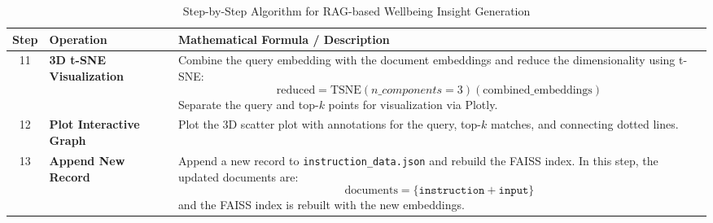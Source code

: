 \begin{table}[H]
    \centering
    \caption*{Step-by-Step Algorithm for RAG-based Wellbeing Insight Generation}
    \label{tab:algorithm}
    \begin{tabularx}{\textwidth}{|c|p{3cm}|X|}
        \hline
        \textbf{Step} & \textbf{Operation} & \textbf{Mathematical Formula / Description} \\ \hline
    
        11 & \textbf{3D t-SNE Visualization} & Combine the query embedding with the document embeddings and reduce the dimensionality using t-SNE:
        \[
        \text{reduced} = \text{TSNE}(n\_components=3)(\text{combined\_embeddings})
        \]
        Separate the query and top-\(k\) points for visualization via Plotly. \\ \hline
        
        12 & \textbf{Plot Interactive Graph} & Plot the 3D scatter plot with annotations for the query, top-\(k\) matches, and connecting dotted lines. \\ \hline
        
        13 & \textbf{Append New Record} & Append a new record to \texttt{instruction\_data.json} and rebuild the FAISS index. In this step, the updated documents are:
        \[
        \text{documents} = \{ \texttt{instruction} + \texttt{input} \}
        \]
        and the FAISS index is rebuilt with the new embeddings. \\ \hline
    \end{tabularx}
\end{table}



